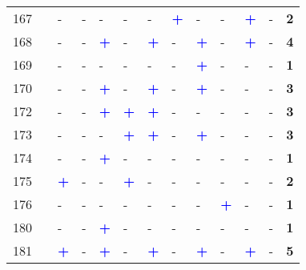 \begin{longtable}{p{0.5cm}p{4.6cm}p{0.3cm}p{0.3cm}p{0.3cm}p{0.3cm}p{0.3cm}p{0.3cm}p{0.3cm}p{0.3cm}p{0.3cm}p{0.3cm}p{1cm}}
    \small{167} & \small{\textcite{radzimski_exploring_2021}}\index{Radzimski, Adam|pagebf} & - & - & - & - & - & \textcolor{blue}{\textbf{+}} & - & - & \textcolor{blue}{\textbf{+}} & - & \textbf{2}\\
    \small{168} & \small{\textcite{rastogi_willingness_2010}}\index{Rastogi, Rajat|pagebf} & - & - & \textcolor{blue}{\textbf{+}} & - & \textcolor{blue}{\textbf{+}} & - & \textcolor{blue}{\textbf{+}} & - & \textcolor{blue}{\textbf{+}} & - & \textbf{4}\\
    \small{169} & \small{\textcite{rastogi_travel_2003}}\index{Rastogi, Rajat|pagebf} & - & - & - & - & - & - & \textcolor{blue}{\textbf{+}} & - & - & - & \textbf{1}\\
    \small{170} & \small{\textcite{ravensbergen_biking_2018}}\index{Ravensbergen, Léa|pagebf} & - & - & \textcolor{blue}{\textbf{+}} & - & \textcolor{blue}{\textbf{+}} & - & \textcolor{blue}{\textbf{+}} & - & - & - & \textbf{3}\\
    \small{172} & \small{\textcite{rietveld_accessibility_2000}}\index{Rietveld, Piet|pagebf} & - & - & \textcolor{blue}{\textbf{+}} & \textcolor{blue}{\textbf{+}} & \textcolor{blue}{\textbf{+}} & - & - & - & - & - & \textbf{3}\\
    \small{173} & \small{\textcite{rijsman_walking_2019}}\index{Rijsman, Lotte|pagebf} & - & - & - & \textcolor{blue}{\textbf{+}} & \textcolor{blue}{\textbf{+}} & - & \textcolor{blue}{\textbf{+}} & - & - & - & \textbf{3}\\
    \small{174} & \small{\textcite{risimati_spatial_2021}}\index{Risimati, Brightnes|pagebf} & - & - & \textcolor{blue}{\textbf{+}} & - & - & - & - & - & - & - & \textbf{1}\\
    \small{175} & \small{\textcite{romm_differences_2022}}\index{Romm, Daniel|pagebf} & \textcolor{blue}{\textbf{+}} & - & - & \textcolor{blue}{\textbf{+}} & - & - & - & - & - & - & \textbf{2}\\
    \small{176} & \small{\textcite{schlueter_langdon_how_2021}}\index{Schlueter Langdon, Chris|pagebf} & - & - & - & - & - & - & - & \textcolor{blue}{\textbf{+}} & - & - & \textbf{1}\\
    \small{180} & \small{\textcite{shaheen_improving_2005}} & - & - & \textcolor{blue}{\textbf{+}} & - & - & - & - & - & - & - & \textbf{1}\\
    \small{181} & \small{\textcite{shelat_analysing_2018}}\index{Shelat, Sanmay|pagebf} & \textcolor{blue}{\textbf{+}} & - & \textcolor{blue}{\textbf{+}} & - & \textcolor{blue}{\textbf{+}} & - & \textcolor{blue}{\textbf{+}} & - & \textcolor{blue}{\textbf{+}} & - & \textbf{5}\\

\end{longtable}
